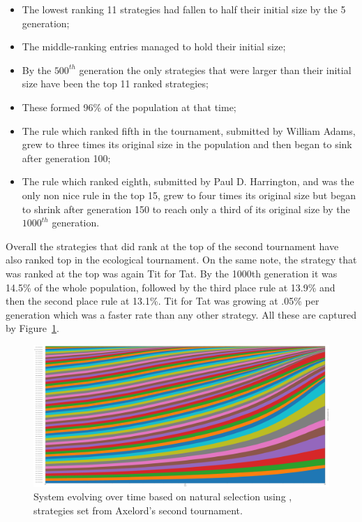 \documentclass{article}
\theoremstyle{definition}
\begin{document}
\begin{itemize}
    \item The lowest ranking 11 strategies had fallen to half their initial size
    by the 5 generation;
    \item The middle-ranking entries managed to hold their initial size;
    \item By the \(500^{th}\) generation the only strategies that were larger than their
    initial size have been the top 11 ranked strategies;
    \item These formed 96\% of the population at that time;
    \item The rule which ranked fifth in the tournament, submitted by William Adams,
    grew to three times its original size in the population and then began to sink
    after generation 100;
    \item The rule which ranked eighth, submitted by Paul D. Harrington, and was
    the only non nice rule in the top 15, grew to four times its original size but
    began to shrink after generation 150 to reach only a third of its original
    size by the \(1000^{th}\) generation.
\end{itemize}

Overall the strategies that did rank at the top of the second tournament have
also ranked top in the ecological tournament. On the same note, the strategy that
was ranked at the top was again Tit for Tat. By the 1000th generation it was 14.5\%
of the whole population, followed by the third place rule at 13.9\% and then the
second place rule at 13.1\%. Tit for Tat was growing at .05\% per generation which
was a faster rate than any other strategy. All these are captured by
Figure~\ref{fig:ecological.tournament}.

\begin{figure}[!hbtp]
    \centering
    \includegraphics[width=.6\textwidth]{./assets/images/ecological.pdf}
    \caption{System evolving over time based on natural selection using
    \cite{axelrodproject}, strategies set from Axelord's second tournament.}
    \label{fig:ecological.tournament}
\end{figure}
\end{document}
